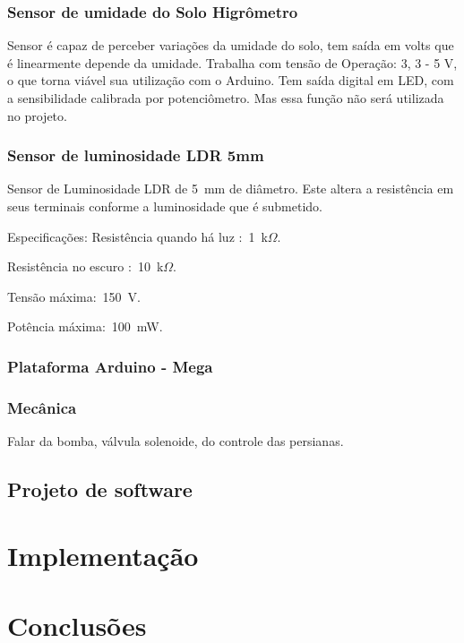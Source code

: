 \documentclass[a4paper,12pt]{report}
\begin{document}
		\subsection{Sensor de umidade do Solo Higrômetro}
		Sensor é capaz de perceber variações da umidade do solo, tem saída em volts que é linearmente depende da umidade.
		Trabalha com tensão de Operação: 3, 3 - 5 V, o que torna viável sua utilização com o Arduino. Tem saída digital em LED, com a sensibilidade calibrada por potenciômetro. Mas essa função não será utilizada no projeto.
	
		\subsection{Sensor de luminosidade LDR 5mm}
		
		Sensor de Luminosidade LDR de 5~mm de diâmetro. Este altera a resistência em seus terminais conforme a luminosidade que é submetido.
		
		Especificações:
		Resistência quando há luz :~1~k$\Omega$.
		
		Resistência no escuro :~10~k$\Omega$.
		
		Tensão máxima:~150~V.
		
		Potência máxima:~100~mW.
		
		\subsection{Plataforma Arduino - Mega}	
		\subsection{Mecânica}
			Falar da bomba, válvula solenoide, do controle das persianas.	
	
		
	\section{Projeto de software}
		
\chapter{Implementação}

\chapter{Conclusões}

 
 

	
	
	
	
	
	
	
	
	
	
	
	
		
	
	
	
\end{document}
